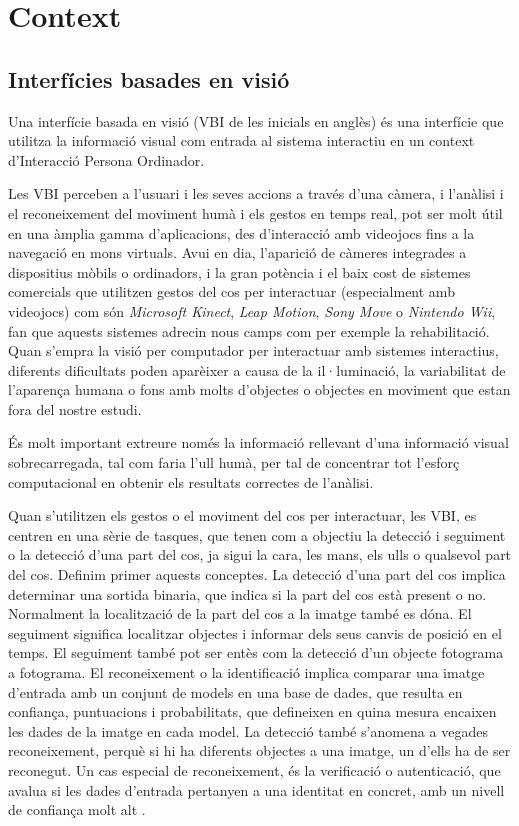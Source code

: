 \documentclass[12pt,a4paper,catalan]{article}
\begin{document}
	\section{Context}
	\subsection{Interfícies basades en visió}
	Una interfície basada en visió (VBI de les inicials en anglès) és una interfície que utilitza la informació visual com entrada al sistema interactiu en un context d'Interacció Persona Ordinador.
	
	Les VBI perceben a  l'usuari i les seves accions a través d'una càmera, i l'anàlisi i el reconeixement del moviment humà i els gestos en temps real, pot ser molt útil en una àmplia gamma d'aplicacions, des d'interacció amb videojocs fins a la navegació en mons virtuals.
	Avui en dia, l'aparició de càmeres integrades a dispositius mòbils o ordinadors, i la gran potència i el baix cost de sistemes comercials que utilitzen gestos del cos per interactuar (especialment amb videojocs) com són \textit{Microsoft Kinect}, \textit{Leap Motion}, \textit{Sony Move} o \textit{Nintendo Wii}, fan que aquests sistemes adrecin nous camps com per exemple la rehabilitació.
	Quan s'empra la visió per computador per interactuar amb sistemes interactius, diferents dificultats poden aparèixer a causa de la il·luminació, la variabilitat de l'aparença humana o fons amb molts d'objectes o objectes en moviment que estan fora del nostre estudi.
	
	És molt important extreure només la informació rellevant d'una informació visual sobrecarregada, tal com faria l'ull humà, per tal de concentrar tot l'esforç computacional en obtenir els resultats correctes de l'anàlisi.
	
	Quan s'utilitzen els gestos o el moviment del cos per interactuar, les VBI, es centren en una sèrie de tasques, que tenen com a objectiu la detecció i seguiment o la detecció d'una part del cos, ja sigui la cara, les mans, els ulls o qualsevol part del cos. Definim primer aquests conceptes. La detecció d'una part del cos implica determinar una sortida binaria, que indica si la part del cos està present o no. Normalment la localització de la part del cos a la imatge també es dóna. El seguiment significa localitzar objectes i informar dels seus canvis de posició en el temps. El seguiment també pot ser entès com la detecció d'un objecte fotograma a fotograma. El reconeixement o la identificació implica comparar una imatge d'entrada amb un conjunt de models en una base de dades, que resulta en confiança, puntuacions i probabilitats, que defineixen en quina mesura encaixen les dades de la imatge en cada model. La detecció també s'anomena a vegades reconeixement, perquè si hi ha diferents objectes a una imatge, un d'ells ha de ser reconegut. Un cas especial de reconeixement, és la verificació o autenticació, que avalua si les dades d'entrada pertanyen a una identitat en concret, amb un nivell de confiança molt alt \cite{tesis-cristina}.\\
	
\end{document}
